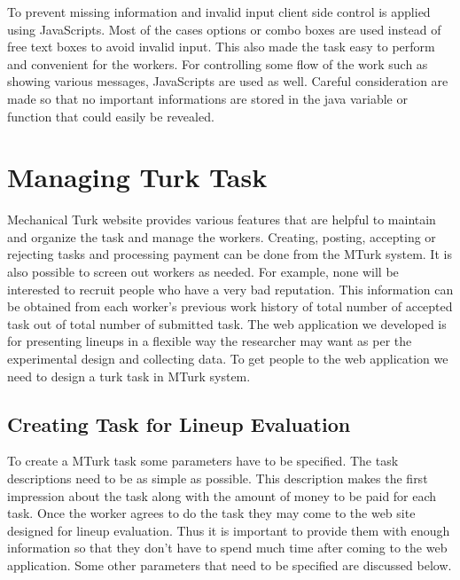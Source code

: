 \documentclass[11pt]{article}
\begin{document}
To prevent missing information and invalid input client side control is applied using JavaScripts. Most of the cases options or combo boxes are used instead of free text boxes to avoid invalid input. This also made the task easy to perform and convenient for the workers. For controlling some flow of the work such as showing various messages, JavaScripts are used as well. Careful consideration are made so that no important informations are stored in the java variable or function that could easily be revealed.


\section{Managing Turk Task}\label{sec:turk_task} \cite{turk} Mechanical Turk website provides various features that are helpful to maintain and organize the task and manage the workers. Creating, posting, accepting or rejecting tasks and processing payment can be done from the MTurk system. It is also possible to screen out workers as needed. For example, none will be interested to recruit people who have a very bad reputation. This information can be obtained from each worker's previous work history of total number of accepted task out of total number of submitted task. The web application we developed is for presenting lineups in a flexible way the researcher may want  as per the experimental design and collecting data. To get people to the web application we need to design a turk task in MTurk system.



\subsection{Creating Task for Lineup Evaluation} To create a MTurk task some parameters have to be specified. The task descriptions need to be as simple as possible. This description makes the first impression about the task along with the amount of money to be paid for each task. Once the worker agrees to do the task they may come to the web site designed for lineup evaluation. Thus it is important to provide them with enough information so that they don't have to spend much time after coming to the web application. Some other parameters that need to be specified are discussed below.
\end{document}
